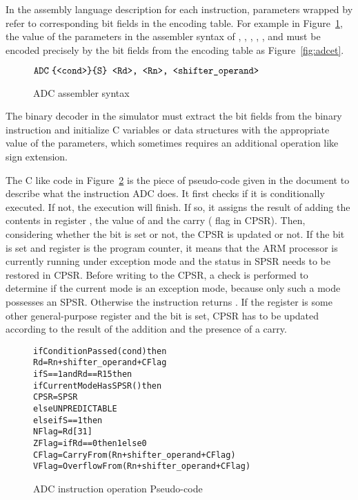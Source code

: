 In the assembly language description for each instruction,
parameters wrapped by \armrf{<~>}
refer to corresponding bit fields in the encoding table.
For example in Figure~\ref{fig:adcas},
the value of the parameters in the assembler syntax of \adc,
, , , ,
and  must be encoded precisely by the bit fields
from the \adc encoding table as Figure~\ref{fig:adcet}.

\begin{figure}[h]
\centering
$\texttt{ADC\;\{<cond>\}\{S\}~<Rd>,~<Rn>,~<shifter\_operand>}$
\caption{ADC assembler syntax}
\label{fig:adcas}
\end{figure}

The binary decoder in the simulator must extract the bit fields from
the binary instruction and initialize C variables or data structures
with the appropriate value of the parameters, which sometimes requires
an additional operation like sign extension.

The C like code in Figure~\ref{fig:adcpc} is the piece of pseudo-code
given in the document to describe what the instruction ADC does.  It
first checks if it is conditionally executed. If not, the execution
will finish. If so, it assigns the result of adding the contents in
register , the value of  and the
carry ( flag in CPSR).  Then, considering whether the
 bit is set or not, the CPSR is updated or not.  If the
 bit is set and register  is the program counter,
it means that the ARM processor is currently running under exception
mode and the status in SPSR needs to be restored in CPSR.  Before
writing to the CPSR, a check is performed to determine if the current
mode is an exception mode, because only such a mode possesses an
SPSR. Otherwise the instruction returns \unpred.  If the register
 is some other general-purpose register and the
 bit is set, CPSR has to be updated according to the
result of the addition and the presence of a carry.

\begin{figure}[h]
\begin{alltt}
if ConditionPassed(cond) then
   Rd = Rn + shifter_operand + C Flag
   if S == 1 and Rd == R15 then
      if CurrentModeHasSPSR() then
         CPSR = SPSR
      else UNPREDICTABLE
   else if S == 1 then
      N Flag = Rd[31]
      Z Flag = if Rd == 0 then 1 else 0
      C Flag = CarryFrom(Rn + shifter_operand + C Flag)
      V Flag = OverflowFrom(Rn + shifter_operand + C Flag)
\end{alltt}
\caption{ADC instruction operation Pseudo-code}
\label{fig:adcpc}
\end{figure}

